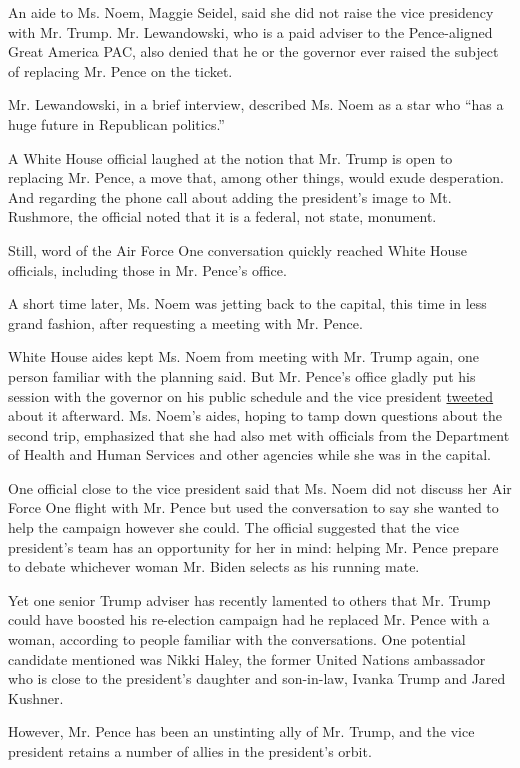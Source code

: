 An aide to Ms. Noem, Maggie Seidel, said she did not raise the vice
presidency with Mr. Trump. Mr. Lewandowski, who is a paid adviser to the
Pence-aligned Great America PAC, also denied that he or the governor
ever raised the subject of replacing Mr. Pence on the ticket.

Mr. Lewandowski, in a brief interview, described Ms. Noem as a star who
``has a huge future in Republican politics.''

A White House official laughed at the notion that Mr. Trump is open to
replacing Mr. Pence, a move that, among other things, would exude
desperation. And regarding the phone call about adding the president's
image to Mt. Rushmore, the official noted that it is a federal, not
state, monument.

Still, word of the Air Force One conversation quickly reached White
House officials, including those in Mr. Pence's office.

A short time later, Ms. Noem was jetting back to the capital, this time
in less grand fashion, after requesting a meeting with Mr. Pence.

White House aides kept Ms. Noem from meeting with Mr. Trump again, one
person familiar with the planning said. But Mr. Pence's office gladly
put his session with the governor on his public schedule and the vice
president
\href{https://twitter.com/mike_pence/status/1286061448897142784?lang=en}{tweeted}
about it afterward. Ms. Noem's aides, hoping to tamp down questions
about the second trip, emphasized that she had also met with officials
from the Department of Health and Human Services and other agencies
while she was in the capital.

One official close to the vice president said that Ms. Noem did not
discuss her Air Force One flight with Mr. Pence but used the
conversation to say she wanted to help the campaign however she could.
The official suggested that the vice president's team has an opportunity
for her in mind: helping Mr. Pence prepare to debate whichever woman Mr.
Biden selects as his running mate.

Yet one senior Trump adviser has recently lamented to others that Mr.
Trump could have boosted his re-election campaign had he replaced Mr.
Pence with a woman, according to people familiar with the conversations.
One potential candidate mentioned was Nikki Haley, the former United
Nations ambassador who is close to the president's daughter and
son-in-law, Ivanka Trump and Jared Kushner.

However, Mr. Pence has been an unstinting ally of Mr. Trump, and the
vice president retains a number of allies in the president's orbit.

